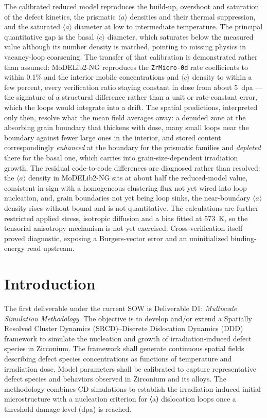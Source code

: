 \documentclass{article}
\newcommand{\aloop}{\ensuremath{\langle a\rangle}}
\newcommand{\cloop}{\ensuremath{\langle c\rangle}}
\newcommand{\ZrOd}{\texttt{ZrMicro-0d}}
\newcommand{\MoDNG}{\textsf{MoDELib2-NG}}
\begin{document}
The calibrated reduced model reproduces the build-up, overshoot and saturation of
the defect kinetics, the prismatic \aloop{} densities and their thermal
suppression, and the saturated \aloop{} diameter at low to intermediate
temperature. The principal quantitative gap is the basal \cloop{} diameter, which
saturates below the measured value although its number density is matched,
pointing to missing physics in vacancy-loop coarsening. The transfer of that
calibration is demonstrated rather than assumed: {\MoDNG} reproduces the {\ZrOd}
rate coefficients to within 0.1\% and the interior mobile concentrations and
\cloop{} density to within a few percent, every verification ratio staying
constant in dose from about 5~dpa --- the signature of a structural difference
rather than a unit or rate-constant error, which the loops would integrate into a
drift. The spatial predictions, interpreted only then,
resolve what the mean field averages away: a denuded zone at the absorbing grain
boundary that thickens with dose, many small loops near the boundary against fewer
large ones in the interior, and stored content correspondingly \emph{enhanced} at
the boundary for the prismatic families and \emph{depleted} there for the basal
one, which carries into grain-size-dependent irradiation growth. The
residual code-to-code differences are diagnosed rather than resolved: the \aloop{}
density in {\MoDNG} sits at about half the reduced-model value, consistent in sign
with a homogeneous clustering flux not yet wired into loop nucleation, and, grain
boundaries not yet being loop sinks, the near-boundary \aloop{} density rises
without bound and is not quantitative. The calculations are further restricted
applied stress, isotropic diffusion and a bias fitted at 573~K, so the tensorial
anisotropy mechanism is not yet exercised.
Cross-verification itself proved diagnostic, exposing a
Burgers-vector error and an uninitialized binding-energy read upstream.
\newpage
\tableofcontents
\newpage
\section{Introduction}
The first deliverable under the current SOW is Deliverable D1: \emph{Multiscale Simulation Methodology}. The objective is to develop and/or extend a Spatially Resolved Cluster Dynamics (SRCD)–Discrete Dislocation
Dynamics (DDD) framework to simulate the nucleation and growth of irradiation-induced
defect species in Zirconium. The framework shall generate continuous spatial fields describing defect
species concentrations as functions of temperature and irradiation dose. Model parameters shall be
calibrated to capture representative defect species and behaviors observed in Zirconium and its
alloys.
The methodology combines CD simulations to establish the irradiation-induced initial microstructure
with a nucleation criterion for ⟨a⟩ dislocation loops once a threshold damage level (dpa) is reached.
\end{document}
